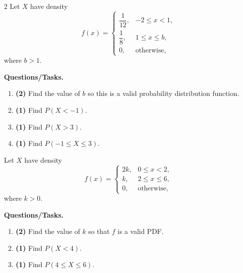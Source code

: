 \begin{multicols}{2}
		\vspace{0.25cm}
		\vspace{-0.3cm}
		Let $X$ have density
		\[
		f(x)=
		\begin{cases}
			\dfrac{1}{12}, & -2\le x<1,\\[4pt]
			\dfrac{1}{8}, & 1\le x\le b,\\[4pt]
			0, & \text{otherwise,}
		\end{cases}
		\]
		where $b>1$.
		
		\textbf{Questions/Tasks.}
		\begin{enumerate}[label=\textbf{\alph*)}]
			\item \textbf{(2)} Find the value of $b$ so this is a valid probability distribution function.
			\item \textbf{(1)} Find $P(X<-1)$.
			\item \textbf{(1)} Find $P(X>3)$.
			\item \textbf{(1)} Find $P(-1\le X\le 3)$.
		\end{enumerate}
		
		\newpage
		\vspace{-0.3cm}
		Let $X$ have density
		\[
		f(x)=
		\begin{cases}
			2k, & 0\le x<2,\\
			k, & 2\le x\le 6,\\
			0, & \text{otherwise,}
		\end{cases}
		\]
		where $k>0$.
		
		\textbf{Questions/Tasks.}
		\begin{enumerate}[label=\textbf{\alph*)}]
			\item \textbf{(2)} Find the value of $k$ so that $f$ is a valid PDF.
			\item \textbf{(1)} Find $P(X<4)$.
			\item \textbf{(1)} Find $P(4\le X\le 6)$.
		\end{enumerate}
		

\end{multicols}
